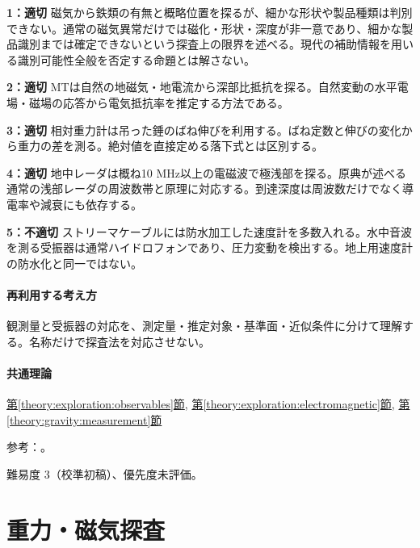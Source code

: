 \noindent\textbf{1：適切} 磁気から鉄類の有無と概略位置を探るが、細かな形状や製品種類は判別できない。通常の磁気異常だけでは磁化・形状・深度が非一意であり、細かな製品識別までは確定できないという探査上の限界を述べる。現代の補助情報を用いる識別可能性全般を否定する命題とは解さない。\par

\noindent\textbf{2：適切} MTは自然の地磁気・地電流から深部比抵抗を探る。自然変動の水平電場・磁場の応答から電気抵抗率を推定する方法である。\par

\noindent\textbf{3：適切} 相対重力計は吊った錘のばね伸びを利用する。ばね定数と伸びの変化から重力の差を測る。絶対値を直接定める落下式とは区別する。\par

\noindent\textbf{4：適切} 地中レーダは概ね10 MHz以上の電磁波で極浅部を探る。原典が述べる通常の浅部レーダの周波数帯と原理に対応する。到達深度は周波数だけでなく導電率や減衰にも依存する。\par

\noindent\textbf{5：不適切} ストリーマケーブルには防水加工した速度計を多数入れる。水中音波を測る受振器は通常ハイドロフォンであり、圧力変動を検出する。地上用速度計の防水化と同一ではない。\par

\paragraph{再利用する考え方} 観測量と受振器の対応を、測定量・推定対象・基準面・近似条件に分けて理解する。名称だけで探査法を対応させない。

\paragraph{共通理論} \hyperref[theory:exploration:observables]{第\ref*{theory:exploration:observables}節}, \hyperref[theory:exploration:electromagnetic]{第\ref*{theory:exploration:electromagnetic}節}, \hyperref[theory:gravity:measurement]{第\ref*{theory:gravity:measurement}節}

\par 参考：\cite{usgs_marine_seismic,usgs_mt_metadata}。

\par 難易度 3（校準初稿）、優先度未評価。

\section{重力・磁気探査}

